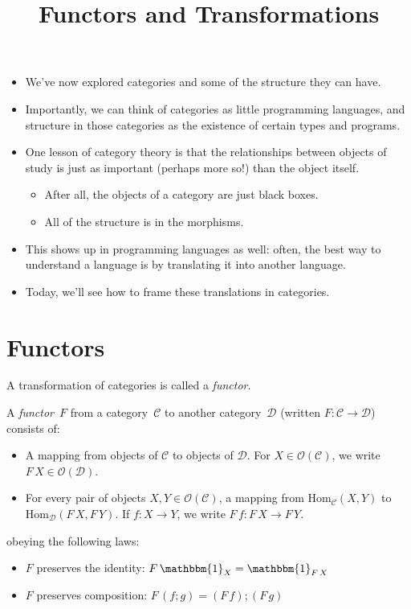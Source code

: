 \documentclass{lecturenotes}
\title{Functors and Transformations}
\newcommand{\obj}[1]{\ensuremath{\mathcal{O}(#1)}}
\renewcommand{\hom}[3][]{\ensuremath{\text{Hom}_{#1}(#2, #3)}}
\newcommand{\id}[1][]{\ensuremath{\mathbbm{1}_{#1}}}
\begin{document}
\maketitle

\begin{itemize}
\item We've now explored categories and some of the structure they can have.
\item Importantly, we can think of categories as little programming languages, and structure in those categories as the existence of certain types and programs.
\item One lesson of category theory is that the relationships between objects of study is just as important (perhaps more so!) than the object itself.
  \begin{itemize}
  \item After all, the objects of a category are just black boxes.
  \item All of the structure is in the morphisms.
  \end{itemize}
\item This shows up in programming languages as well: often, the best way to understand a language is by translating it into another language.
\item Today, we'll see how to frame these translations in categories.
\end{itemize}

\section{Functors}
\label{sec:functors}

A transformation of categories is called a \emph{functor}.

\begin{defn}[Functor]
  A \emph{functor}~$F$ from a category~$\mathcal{C}$ to another category~$\mathcal{D}$ (written $F : \mathcal{C} \to \mathcal{D}$) consists of:
  \begin{itemize}
  \item A mapping from objects of $\mathcal{C}$ to objects of $\mathcal{D}$.
    For $X \in \obj{\mathcal{C}}$, we write $F\,X \in \obj{\mathcal{D}}$.
  \item For every pair of objects $X, Y \in \obj{\mathcal{C}}$, a mapping from $\hom[\mathcal{C}]{X}{Y}$ to $\hom[\mathcal{D}]{F\,X}{F\,Y}$.
    If $f : X \to Y$, we write $F\,f : F\,X \to F\,Y$.
  \end{itemize}
  obeying the following laws:
  \begin{itemize}
  \item $F$ preserves the identity: $F\,\id[X] = \id[F\,X]$
  \item $F$ preserves composition: $F\,(f; g) = (F\,f); (F\,g)$
  \end{itemize}
\end{defn}
\end{document}
